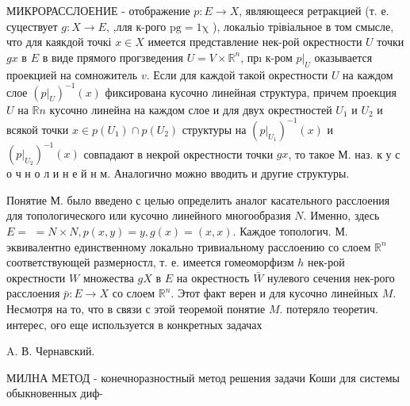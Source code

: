 \documentclass[10pt]{article}
\begin{document}
МИКРОРАССЛОЕНИЕ - отображение $p: E \rightarrow X$, являющееся ретракцией (т. е. суцествует $g: X \rightarrow E$, ,лля к-рого $\mathrm{pg}=1 \mathrm{\chi}$ ), локальіо трівіальное в том смысле, что для каякдой точкі $x \in X$ имеется представление нек-рой окрестности $U$ точки $g x$ в $E$ в виде прямого прогзведения $U=V \times \mathbb{R}^{n}$, прı к-ром $\left.p\right|_{U}$ оказывается проекцией на сомножитель $v$. Если для каждой такой окрестности $U$ на каждом слое $\left(\left.p\right|_{U}\right)^{-1}(x)$ фиксирована кусочно линейная структура, причем проекция $U$ на $\mathbb{R} n$ кусочно линейна на каждом слое и для двух окрестностей $U_{1}$ и $U_{2}$ и всякой точки $x \in p\left(U_{1}\right) \cap p\left(U_{2}\right)$ структуры на $\left(\left.p\right|_{U_{1}}\right)^{-1}(x)$ и $\left(\left.p\right|_{U_{2}}\right)^{-1}(x)$ совпадают в некрой окрестности точки $g x$, то такое М. наз. к у с о ч н о л и н е й н м. Аналогично можно вводить и другие структуры.



Понятие М. было введено с целью определить аналог касательного расслоения для топологического или кусочно линейного многообразия $N$. Именно, здесь $E=$ $=N \times N, p(x, y)=y, g(x)=(x, x)$. Каждое топологич. М. эквивалентно единственному локально тривиальному расслоению со слоем $\mathbb{R}^{n}$ соответствующей размерностл, т. е. имеется гомеоморфизм $h$ нек-рой окрестности $W$ множества $g X$ в $E$ на окрестность $\bar{W}$ нулевого сечения нек-рого расслоения $\bar{p}: E \rightarrow X$ со слоем $\mathbb{R}^{n}$. Этот факт верен и для кусочно линеӥных $M$. Несмотря на то, что в связи с этой теоремой понятие $M$. потеряло теоретич. интерес, оғо еще используется в конкретных задачах



A. В. Чернавский.



МИЛНА МЕТОД - конечноразностный метод решения задачи Коши для системы обыкновенных диф-
\end{document}

